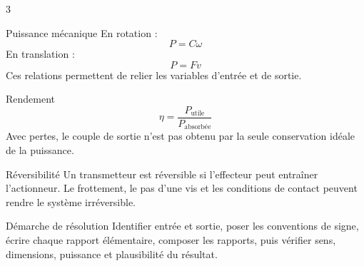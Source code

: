 \documentclass[a3paper,landscape,10pt]{article}
\begin{document}
\begin{multicols}{3}
\begin{TLPosterBloc}{Puissance mécanique}
En rotation :
\[
P=C\omega
\]
En translation :
\[
P=Fv
\]
Ces relations permettent de relier les variables d'entrée et de sortie.
\end{TLPosterBloc}

\begin{TLPosterBloc}{Rendement}
\[
\eta=\frac{P_{\mathrm{utile}}}{P_{\mathrm{absorbée}}}
\]
Avec pertes, le couple de sortie n'est pas obtenu par la seule conservation idéale de la puissance.
\end{TLPosterBloc}

\begin{TLPosterBloc}{Réversibilité}
Un transmetteur est réversible si l'effecteur peut entraîner l'actionneur. Le frottement, le pas d'une vis et les conditions de contact peuvent rendre le système irréversible.
\end{TLPosterBloc}

\begin{TLPosterBloc}{Démarche de résolution}
Identifier entrée et sortie, poser les conventions de signe, écrire chaque rapport élémentaire, composer les rapports, puis vérifier sens, dimensions, puissance et plausibilité du résultat.
\end{TLPosterBloc}

\end{multicols}
\end{document}
